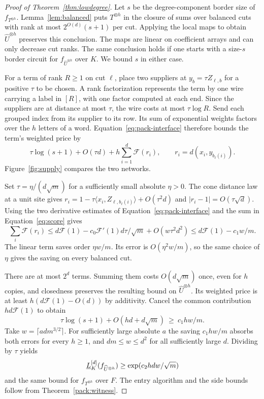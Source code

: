 \begin{proof}[Proof of Theorem~\ref{thm:lowdegree}]
Let $s$ be the degree-component border size of $f_{T^{\otimes h}}$.
Lemma~\ref{lem:balanced} puts $T^{\otimes h}$ in the closure of
sums over balanced cuts with rank at most $2^{O(d)}(s+1)$ per cut.
Applying the local maps to obtain $\widehat U^{\otimes h}$ preserves
this conclusion. The maps are linear on coefficient arrays and can
only decrease cut ranks. The same conclusion holds if one starts
with a size-$s$ border circuit for $f_{\widehat U^{\otimes h}}$ over
$K$. We bound $s$ in either case.

For a term of rank $R\ge1$ on cut $\ell$, place two suppliers at
$y_b=\tau Z_{\ell,b}$ for a positive $\tau$ to be chosen. A rank
factorization represents the term by one wire carrying a label in
$[R]$, with one factor computed at each end. Since the suppliers
are at distance at most $\tau$, the wire costs at most $\tau\log R$.
Send each grouped index from its supplier to its row. Its sum of
exponential weights factors over the $h$ letters of a word.
Equation~\eqref{eq:pack-interface} therefore bounds the term's
weighted price by
\begin{equation}\label{eq:cut-price}
 \tau\log(s+1)+O(\tau d)+h\sum_{i=1}^d \mathcal F(r_i),\qquad
 r_i=d(x_i,y_{b_\ell(i)}).
\end{equation}
Figure~\ref{fig:supply} compares the two networks.


Set $\tau=\eta/(d\sqrt m)$ for a sufficiently small absolute $\eta>0$.
The cone distance law at a unit site gives
$r_i=1-\tau\langle x_i,Z_{\ell,b_\ell(i)}\rangle+O(\tau^2d)$
and $|r_i-1|=O(\tau\sqrt d)$. Using the two derivative estimates of
Equation~\eqref{eq:pack-interface} and the sum in Equation~\eqref{eq:score}
gives
\[
 \sum_i \mathcal F(r_i)\le d\mathcal F(1)
                 -c_0\mathcal F'(1)d\tau/\sqrt m+O(w\tau^2d^2)
               \le d\mathcal F(1)-c_1 w/m .
\]
The linear term saves order $\eta w/m$. Its error is $O(\eta^2w/m)$,
so the same choice of $\eta$ gives the saving on every balanced cut.

There are at most $2^d$ terms. Summing them costs $O(d\sqrt m)$ once,
even for $h$ copies, and closedness preserves the resulting bound on
$\widehat U^{\otimes h}$. Its weighted price is at least
$h(d\mathcal F(1)-O(d))$ by additivity. Cancel the common contribution
$hd\mathcal F(1)$ to obtain
\begin{equation}\label{eq:balance-cost}
    \tau\log(s+1)+O(hd+d\sqrt m)\ \ge\ c_1 h w/m .
\end{equation}
Take $w=\lceil a d m^{3/2}\rceil$. For sufficiently large absolute
$a$ the saving $c_1 h w/m$ absorbs both errors for every $h\ge1$,
and $dm\le w\le d^2$ for all sufficiently large $d$. Dividing by
$\tau$ yields
\begin{equation}\label{eq:packed-hardness}
 \underline L_K^{[d]}(f_{\widehat U^{\otimes h}})
       \ge \exp(c_2 h d w/\sqrt m)
\end{equation}
and the same bound for $f_{T^{\otimes h}}$ over $F$.
The entry algorithm and the side bounds follow from
Theorem~\ref{pack:witness}.
\end{proof}

